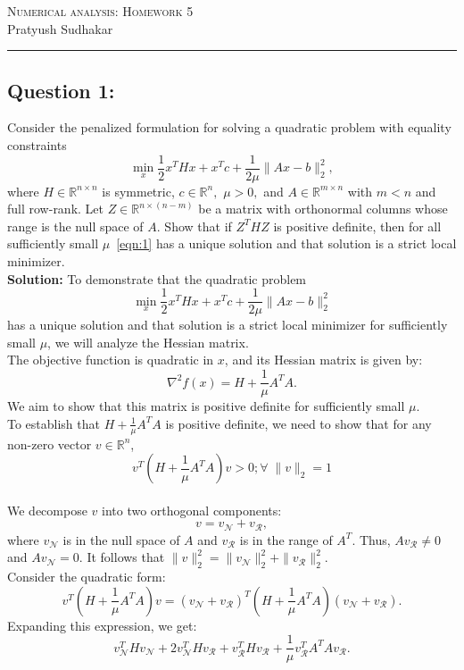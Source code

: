 \documentclass[11pt,onecolumn]{article}
\newcommand{\R}{\mathbb{R}}
\newcommand{\Rn}{\R^{n\times n}}
\newcommand{\Rmn}{\R^{m\times n}}
\begin{document}
\noindent
\textsc{\Large Numerical analysis: Homework 5}\\
Pratyush Sudhakar
\\
\vspace{3pt}
\hrule

\subsection*{Question 1:}
Consider the penalized formulation for solving a quadratic problem with equality constraints
\begin{equation}
\min_x \frac{1}{2}x^THx + x^Tc + \frac{1}{2\mu}\|Ax-b\|_2^2,
\label{eqn:1}
\end{equation}
where $H\in\Rn$ is symmetric, $c\in\R^n,$ $\mu > 0,$ and $A\in\Rmn$ with $m<n$ and full row-rank. Let $Z\in\R^{n\times (n-m)}$ be a matrix with orthonormal columns whose range is the null space of $A.$ Show that if $Z^THZ$ is positive definite, then for all sufficiently small $\mu$~\eqref{eqn:1} has a unique solution and that solution is a strict local minimizer.
\\
\textbf{Solution:}
To demonstrate that the quadratic problem
\[
\min_x \frac{1}{2}x^THx + x^Tc + \frac{1}{2\mu}\|Ax-b\|_2^2
\]
has a unique solution and that solution is a strict local minimizer for sufficiently small \(\mu\), we will analyze the Hessian matrix.
\\
The objective function is quadratic in \(x\), and its Hessian matrix is given by:
\[
\nabla^2 f(x) = H + \frac{1}{\mu}A^T A.
\]
We aim to show that this matrix is positive definite for sufficiently small \(\mu\).
\\
To establish that \(H + \frac{1}{\mu}A^T A\) is positive definite, we need to show that for any non-zero vector \(v \in \mathbb{R}^n\),
\[
v^T \left(H + \frac{1}{\mu} A^T A\right) v > 0; \forall\;\|v\|_2 = 1
\]
\\
We decompose \(v\) into two orthogonal components:
\[
v = v_\mathcal{N} + v_\mathcal{R},
\]
where \(v_\mathcal{N}\) is in the null space of \(A\) and \(v_\mathcal{R}\) is in the range of \(A^T\). Thus, \(A v_\mathcal{R} \neq 0\) and \(A v_\mathcal{N} = 0\). It follows that \(\|v\|_2^2 = \|v_\mathcal{N}\|_2^2 + \|v_\mathcal{R}\|_2^2\).
\\
Consider the quadratic form:
\[
v^T \left(H + \frac{1}{\mu} A^T A\right) v = (v_\mathcal{N} + v_\mathcal{R})^T \left(H + \frac{1}{\mu} A^T A\right) (v_\mathcal{N} + v_\mathcal{R}).
\]
Expanding this expression, we get:
\[
v_\mathcal{N}^T H v_\mathcal{N} + 2 v_\mathcal{N}^T H v_\mathcal{R} + v_\mathcal{R}^T H v_\mathcal{R} + \frac{1}{\mu} v_\mathcal{R}^T A^T A v_\mathcal{R}.
\]
\end{document}

